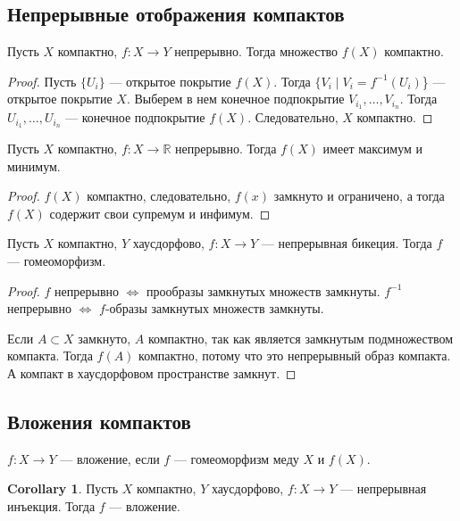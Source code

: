\documentclass[11pt]{book}
\newcommand{\R}{\mathbb{R}}
\theoremstyle{definition}
\theoremstyle{plain}
\theoremstyle{plain}
\theoremstyle{definition}
\newtheorem*{cor}{Corollary}
\theoremstyle{remark}
\begin{document}
\subsection{Непрерывные отображения компактов}
\begin{thm}
    Пусть $ X$ компактно,  $ f: X \to  Y$ непрерывно.
    Тогда множество  $ f(X)$ компактно.
\end{thm}
\begin{proof}
Пусть  $ \{U_i\}$ --- открытое покрытие $ f(X)$. Тогда  $ \{V_i \mid V_i = f^{-1}(U_i)$\} ---  открытое покрытие $ X$.
Выберем в нем конечное подпокрытие  $ V_{i_1}, \ldots , V_{i_n}$. Тогда $ U_{i_1}, \ldots, U_{i_n}$ --- конечное подпокрытие $ f(X)$. Следовательно,  $ X$ компактно.
\end{proof}
\begin{thm}
    Пусть $ X$ компактно,  $ f: X \to  \R$ непрерывно. Тогда $ f(X)$ имеет максимум и минимум.
\end{thm}
\begin{proof}
    $ f(X)$ компактно, следовательно,  $ f(x)$ замкнуто и ограничено, а тогда  $ f(X)$ содержит свои супремум и инфимум.
\end{proof}
\begin{thm}
     Пусть $ X$ компактно,  $ Y$  хаусдорфово, $ f: X \to  Y$ --- непрерывная бикеция. Тогда $ f$ --- гомеоморфизм.
\end{thm}
\begin{proof}
    $ f$ непрерывно  $ \Longleftrightarrow $ прообразы замкнутых множеств замкнуты.
    $ f^{-1}$ непрерывно $ \Longleftrightarrow $ $ f$-образы замкнутых множеств замкнуты.
     
    Если  $ A \subset X$ замкнуто, 
    $ A$ компактно, так как является  замкнутым подмножеством компакта.  Тогда $ f(A)$ компактно, потому что это непрерывный образ компакта. А компакт в хаусдорфовом пространстве замкнут. 
\end{proof}
\subsection{Вложения компактов}
\begin{defn}
    $ f: X \to  Y$ --- вложение, если $ f$ ---  гомеоморфизм меду  $ X$ и  $ f(X)$.
\end{defn}
\begin{cor}
    Пусть $ X$ компактно,  $ Y$ хаусдорфово,  $ f: X \to  Y$ --- непрерывная  инъекция. Тогда $ f$ --- вложение.
\end{cor}
\end{document}
